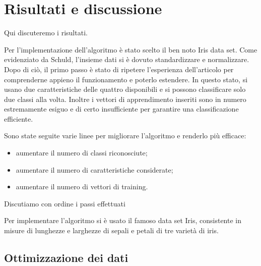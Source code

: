 \chapter{Risultati e discussione}\label{ch:risultati}


Qui discuteremo i risultati. 

Per l'implementazione dell'algoritmo è stato scelto il ben noto 
Iris data set. Come evidenziato da Schuld\cite{schuld}, 
l'insieme dati si è dovuto standardizzare e 
normalizzare. Dopo di ciò, il primo passo è stato di 
ripetere l'esperienza dell'articolo per comprenderne 
appieno il funzionamento e poterlo estendere. 
In questo stato, si usano due caratteristiche delle 
quattro disponibili e si possono classificare solo 
due classi alla volta. Inoltre i vettori di apprendimento 
inseriti sono in numero estremamente esiguo e di certo 
insufficiente per garantire una classificazione efficiente. 


Sono state seguite varie linee per migliorare l'algoritmo 
e renderlo più efficace: 
\begin{itemize}
    \item aumentare il numero di classi riconosciute;
    \item aumentare il numero di caratteristiche considerate;
    \item aumentare il numero di vettori di training.
\end{itemize}


Discutiamo con ordine i passi effettuati

Per implementare l'algoritmo si è usato il famoso data set Iris, 
consistente in misure di lunghezze e larghezze di sepali e petali di 
tre varietà di iris. 

\section{Ottimizzazione dei dati}

